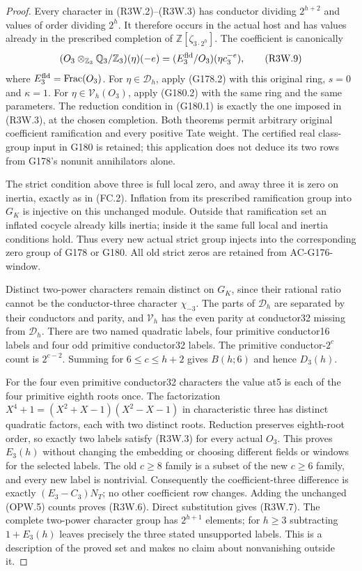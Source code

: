 \begin{proof}
Every character in (R3W.2)--(R3W.3) has conductor dividing
$2^{h+2}$ and values of order dividing $2^h$.
It therefore occurs in the actual host and has values already in
the prescribed completion of $\mathbb Z[\zeta_{3\cdot2^h}]$.
The coefficient is canonically
\[
 (O_3\otimes_{\mathbb Z_3}\mathbb Q_3/\mathbb Z_3)(\eta)(-e)
                         =(E_3^{\rm fld}/O_3)(\eta c_3^{-e}),
 \tag{R3W.9}
\]
where $E_3^{\rm fld}=\operatorname{Frac}(O_3)$.
For $\eta\in\mathscr D_h$, apply (G178.2) with this original ring,
$s=0$ and $\kappa=1$.
For $\eta\in\mathscr V_h(O_3)$, apply (G180.2) with the same ring
and the same parameters.  The reduction condition in (G180.1)
is exactly the one imposed in (R3W.3), at the chosen completion.
Both theorems permit arbitrary original coefficient ramification
and every positive Tate weight.
The certified real class-group input in G180 is retained; this
application does not deduce its two rows from G178's nonunit
annihilators alone.

The strict condition above three is full local zero, and away
three it is zero on inertia, exactly as in (FC.2).
Inflation from its prescribed ramification group into $G_K$
is injective on this unchanged module.
Outside that ramification set an inflated cocycle already kills
inertia; inside it the same full local and inertia conditions hold.
Thus every new actual strict group injects into the corresponding
zero group of G178 or G180.
All old strict zeros are retained from AC-G176-window.

Distinct two-power characters remain distinct on $G_K$, since
their rational ratio cannot be the conductor-three character
$\chi_{-3}$.  The parts of $\mathscr D_h$ are separated by
their conductors and parity, and $\mathscr V_h$ has the even
parity at conductor32 missing from $\mathscr D_h$.
There are two named quadratic labels, four primitive conductor16
labels and four odd primitive conductor32 labels.
The primitive conductor-$2^c$ count is $2^{c-2}$.
Summing for $6\leq c\leq h+2$ gives $B(h;6)$ and hence $D_3(h)$.

For the four even primitive conductor32 characters the value at5
is each of the four primitive eighth roots once.
The factorization
$X^4+1=(X^2+X-1)(X^2-X-1)$ in characteristic three has distinct
quadratic factors, each with two distinct roots.
Reduction preserves eighth-root order, so exactly two labels
satisfy (R3W.3) for every actual $O_3$.
This proves $E_3(h)$ without changing the embedding or choosing
different fields or windows for the selected labels.
The old $c\geq8$ family is a subset of the new $c\geq6$ family,
and every new label is nontrivial.
Consequently the coefficient-three difference is exactly
$(E_3-C_3)N_T$; no other coefficient row changes.
Adding the unchanged (OPW.5) counts proves (R3W.6).
Direct substitution gives (R3W.7).
The complete two-power character group has $2^{h+1}$ elements;
for $h\geq3$ subtracting $1+E_3(h)$ leaves precisely the three
stated unsupported labels.  This is a description of the proved
set and makes no claim about nonvanishing outside it.


\end{proof}
